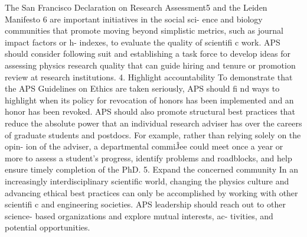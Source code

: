 The San Francisco Declaration on Research Assessment5 and the
Leiden Manifesto 6 are important initiatives in the social sci-
ence and biology communities that promote moving beyond
simplistic metrics, such as journal impact factors or h- indexes,
to evaluate the quality of scientifi c work. APS should consider
following suit and establishing a task force to develop ideas for
assessing physics research quality that can guide hiring and
tenure or promotion review at research institutions.
4. Highlight accountability
To demonstrate that the APS Guidelines on Ethics are taken
seriously, APS should fi nd ways to highlight when its policy
for revocation of honors has been implemented and an honor
has been revoked. APS should also promote structural best
practices that reduce the absolute power that an individual
research adviser has over the careers of graduate students and
postdocs. For example, rather than relying solely on the opin-
ion of the adviser, a departmental commiĴee could meet once
a year or more to assess a student’s progress, identify problems
and roadblocks, and help ensure timely completion of the PhD.
5. Expand the concerned community
In an increasingly interdisciplinary scientific world, changing
the physics culture and advancing ethical best practices can
only be accomplished by working with other scientifi c and
engineering societies. APS leadership should reach out to other
science- based organizations and explore mutual interests, ac-
tivities, and potential opportunities.
